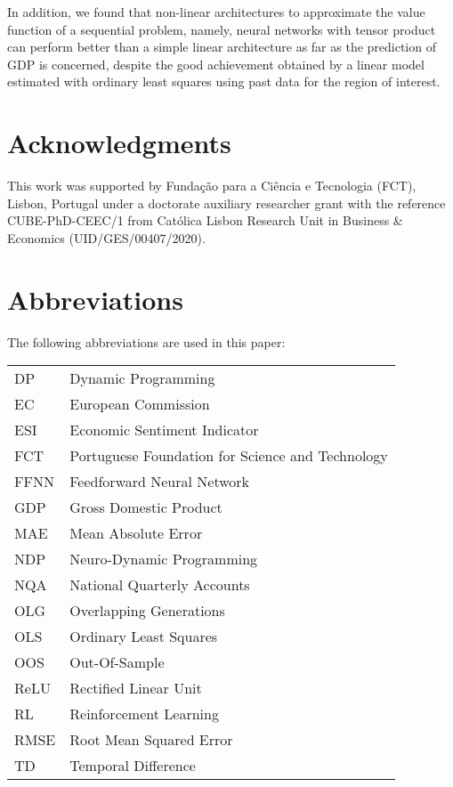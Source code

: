 In addition, we found that non-linear architectures to approximate the value function of a sequential problem, namely, neural networks with tensor product can perform better than a simple linear architecture as far as the prediction of GDP is concerned, despite the good achievement obtained by a linear model estimated with ordinary least squares using past data for the region of interest.   


\section*{Acknowledgments}
\label{sec:acknowledgments}

This work was supported by Fundação para a Ciência e Tecnologia (FCT), Lisbon, Portugal under a doctorate auxiliary researcher grant with the reference CUBE-PhD-CEEC/1 from Católica Lisbon Research Unit in Business \& Economics (UID/GES/00407/2020).

\section*{Abbreviations}
\label{sec:abbreviations}

The following abbreviations are used in this paper:\\

\noindent 
\begin{tabular}{@{}ll}
DP      & Dynamic Programming\\
EC      & European Commission\\
ESI     & Economic Sentiment Indicator\\
FCT     & Portuguese Foundation for Science and Technology\\
FFNN    & Feedforward Neural Network\\
GDP     & Gross Domestic Product\\
MAE     & Mean Absolute Error\\
NDP     & Neuro-Dynamic Programming\\
NQA     & National Quarterly Accounts\\
OLG     & Overlapping Generations\\
OLS     & Ordinary Least Squares\\
OOS     & Out-Of-Sample\\
ReLU    & Rectified Linear Unit\\
RL      & Reinforcement Learning\\
RMSE    & Root Mean Squared Error\\
TD      & Temporal Difference
\end{tabular}





